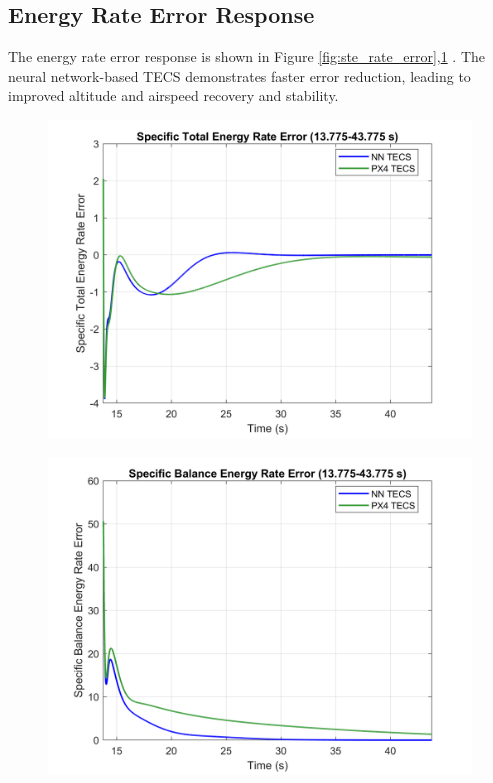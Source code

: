 \documentclass[journal,article,submit,pdftex,moreauthors]{Definitions/mdpi}
\begin{document}
\subsection{Energy Rate Error Response}
The energy rate error response is shown in Figure \ref{fig:ste_rate_error},\ref{fig:sbe_rate_error} . The neural network-based TECS demonstrates faster error reduction, leading to improved altitude and airspeed recovery and stability.
\begin{figure}[H]
    \centering
    \begin{minipage}{0.45\textwidth}
        \centering
        \includegraphics[width=\linewidth]{ste_rate_error_plot.png}
        \label{fig:ste_rate_error}
    \end{minipage}
    \hfill
    \begin{minipage}{0.45\textwidth}
        \centering
        \includegraphics[width=\linewidth]{sbe_rate_error_plot.png}
        \label{fig:sbe_rate_error}
    \end{minipage}
\end{figure}
\end{document}
